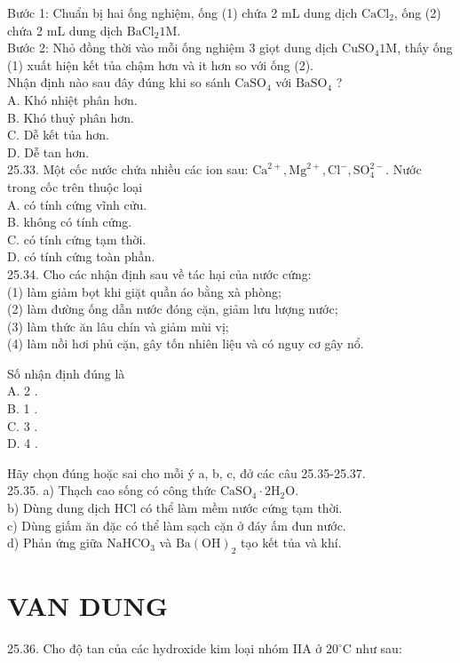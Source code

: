 \documentclass[10pt]{article}
\begin{document}
Bước 1: Chuẩn bị hai ống nghiệm, ống (1) chứa 2 mL dung dịch $\mathrm{CaCl}_{2}$, ống (2) chứa 2 mL dung dịch $\mathrm{BaCl}_{2} 1 \mathrm{M}$.\\
Bước 2: Nhỏ đồng thời vào mỗi ống nghiệm 3 giọt dung dịch $\mathrm{CuSO}_{4} 1 \mathrm{M}$, thấy ống (1) xuất hiện kết tủa chậm hơn và it hơn so với ống (2).\\
Nhận định nào sau đây đúng khi so sánh $\mathrm{CaSO}_{4}$ với $\mathrm{BaSO}_{4}$ ?\\
A. Khó nhiệt phân hơn.\\
B. Khó thuỷ phân hơn.\\
C. Dễ kết tủa hơn.\\
D. Dễ tan hơn.\\
25.33. Một cốc nước chứa nhiều các ion sau: $\mathrm{Ca}^{2+}, \mathrm{Mg}^{2+}, \mathrm{Cl}^{-}, \mathrm{SO}_{4}^{2-}$. Nước trong cốc trên thuộc loại\\
A. có tính cứng vĩnh cửu.\\
B. không có tính cứng.\\
C. có tính cứng tạm thời.\\
D. có tính cứng toàn phần.\\
25.34. Cho các nhận định sau về tác hại của nước cứng:\\
(1) làm giảm bọt khi giặt quần áo bằng xà phòng;\\
(2) làm đường ống dẫn nước đóng cặn, giảm lưu lượng nước;\\
(3) làm thức ăn lâu chín và giảm mùi vị;\\
(4) làm nồi hơi phủ cặn, gây tốn nhiên liệu và có nguy cơ gây nổ.

Số nhận định đúng là\\
A. 2 .\\
B. 1 .\\
C. 3 .\\
D. 4 .

Hãy chọn đúng hoặc sai cho mỗi ý a, b, c, đở các câu 25.35-25.37.\\
25.35. a) Thạch cao sống có công thức $\mathrm{CaSO}_{4} \cdot 2 \mathrm{H}_{2} \mathrm{O}$.\\
b) Dùng dung dịch HCl có thể làm mềm nước cứng tạm thời.\\
c) Dùng giấm ăn đặc có thể làm sạch cặn ở đáy ấm đun nước.\\
d) Phản ứng giữa $\mathrm{NaHCO}_{3}$ và $\mathrm{Ba}(\mathrm{OH})_{2}$ tạo kết tủa và khí.

\section*{VAN DUNG}
25.36. Cho độ tan của các hydroxide kim loại nhóm IIA ở $20^{\circ} \mathrm{C}$ như sau:
\end{document}
